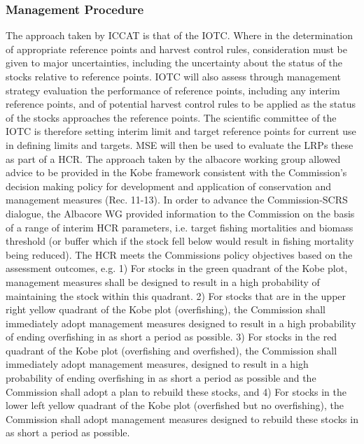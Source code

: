 \documentclass[%
nonumbib,      %
%
]{nrc1}                          %
\begin{document}
    

\subsubsection*{Management Procedure}

The approach taken by ICCAT is that of the IOTC. Where in the determination of appropriate reference points and harvest control rules, consideration must be given to major uncertainties, including the uncertainty about the status of the stocks relative to reference points. IOTC will also assess through management strategy evaluation the performance of reference points, including any interim reference points, and of potential harvest control rules to be applied as the status of the stocks approaches the reference points. The scientific committee of the IOTC is therefore setting interim limit and target reference points for current use in defining limits and targets. MSE will then be used to evaluate the LRPs these as part of a HCR. The approach taken by the albacore working group allowed advice to be provided in the Kobe framework consistent with the Commission’s decision making policy for development and application of conservation and management measures (Rec. 11-13). In order to advance the Commission-SCRS dialogue, the Albacore WG provided information to the Commission on the basis of a range of interim HCR parameters, i.e. target fishing mortalities and biomass threshold (or buffer which if the stock fell below would result in fishing mortality being reduced). The HCR meets the Commissions policy objectives based on the assessment outcomes, e.g. 1) For stocks in the green quadrant of the Kobe plot, management measures shall be designed to result in a high probability of maintaining the stock within this quadrant. 2) For stocks that are in the upper right yellow quadrant of the Kobe plot (overfishing), the Commission shall immediately adopt management measures designed to result in a high probability of ending overfishing in as short a period as possible. 3) For stocks in the red quadrant of the Kobe plot (overfishing and overfished), the Commission shall immediately adopt management measures, designed to result in a high probability of ending overfishing in as short a period as possible and the Commission shall adopt a plan to rebuild these stocks, and 4) For stocks in the lower left yellow quadrant of the Kobe plot (overfished but no overfishing), the Commission shall adopt management measures designed to rebuild these stocks in as short a period as possible.
\end{document}

